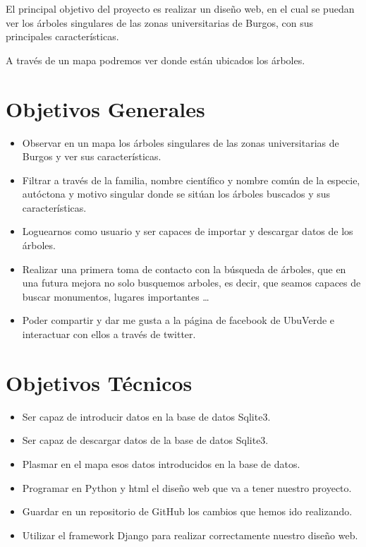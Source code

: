 
El principal objetivo del proyecto es realizar un diseño web, en el cual se puedan ver los árboles singulares de las zonas universitarias de Burgos, con sus principales características.

A través de un mapa podremos ver donde están ubicados los árboles. 
\section{Objetivos Generales}
\begin{itemize}
	\item Observar en un mapa los árboles singulares de las zonas universitarias de Burgos y ver sus características.
	\item Filtrar a través de la familia, nombre científico y nombre común de la especie, autóctona y motivo singular donde se sitúan los árboles buscados y sus características.
	\item Loguearnos como usuario y ser capaces de importar y descargar datos de los árboles.
	\item Realizar una primera toma de contacto con la búsqueda de árboles, que en una futura mejora no solo busquemos arboles, es decir, que seamos capaces de buscar monumentos, lugares importantes \ldots
	\item Poder compartir y dar me gusta a la página de facebook de UbuVerde e interactuar con ellos a través de twitter. 
\end{itemize}

\section{Objetivos Técnicos}
\begin{itemize}
	\item Ser capaz de introducir datos en la base de datos Sqlite3.
	\item Ser capaz de descargar datos de la base de datos Sqlite3.
	\item Plasmar en el mapa esos datos introducidos en la base de datos. 
	\item Programar en Python y html el diseño web que va a tener nuestro proyecto.
	\item Guardar en un repositorio de GitHub los cambios que hemos ido realizando.
	\item Utilizar el framework Django para realizar correctamente nuestro diseño web.
	 
\end{itemize}